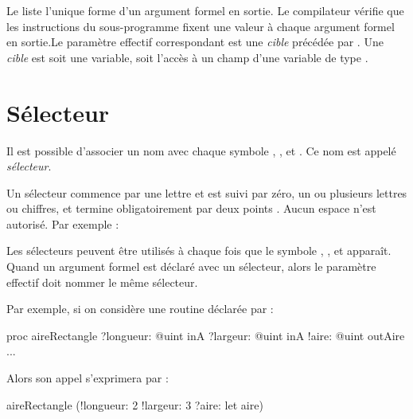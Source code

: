 Le  liste l'unique forme d'un argument formel en sortie. Le compilateur vérifie que les instructions du sous-programme fixent une valeur à chaque argument formel en sortie.Le paramètre effectif correspondant est une \emph{cible} précédée par . Une \emph{cible} est soit une variable, soit l'accès à un champ d'une variable de type .














\section{Sélecteur}

Il est possible d'associer un nom avec chaque symbole , , \galgast{!} et . Ce nom est appelé \emph{sélecteur}.

Un sélecteur commence par une lettre et est suivi par zéro, un ou plusieurs lettres ou chiffres, et termine obligatoirement par deux points \galgast{:}. Aucun espace n'est autorisé. Par exemple :



Les sélecteurs peuvent être utilisés à chaque fois que le symbole , , \galgast{!} et  apparaît. Quand un argument formel est déclaré avec un sélecteur, alors le paramètre effectif doit nommer le même sélecteur.

Par exemple, si on considère une routine déclarée par :

\begin{galgascode}
proc aireRectangle
  ?longueur: @uint inA
  ?largeur: @uint inA
  !aire: @uint outAire 
{
  ...
}
\end{galgascode}

Alors son appel s'exprimera par :
\begin{galgascode}
  aireRectangle (!longueur: 2 !largeur: 3 ?aire: let aire) 
\end{galgascode}


